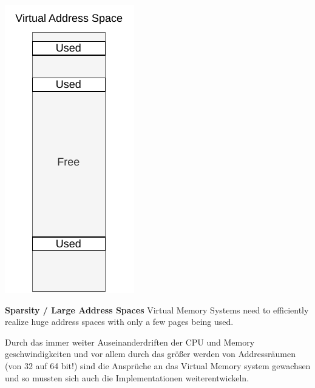 \begin{marginfigure}
    \centering
    \includegraphics*[width=0.5\marginparwidth]{figures/fund_sparsity.pdf}
    \caption{\textbf{Sparsity / Large Address Spaces} Virtual Memory Systems need to efficiently
        realize huge address spaces with only a few pages being used.}
\end{marginfigure}



Durch das immer weiter Auseinanderdriften der CPU und Memory geschwindigkeiten und vor allem
durch das größer werden von Addressräumen (von 32 auf 64 bit!)  sind die Ansprüche an
das Virtual Memory system gewachsen und so mussten sich auch die Implementationen weiterentwickeln.



